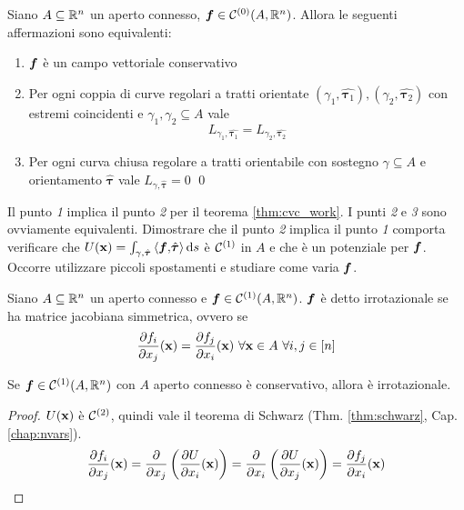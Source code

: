 \begin{theorem}
	Siano $A\subseteq\mathbb{R}^n$ un aperto connesso, $\bm f \in \mathcal{C}^{(0)}(A,\mathbb{R}^n)$. Allora le seguenti affermazioni sono equivalenti:
	\begin{enumerate}
		\item $\bm f$ è un campo vettoriale conservativo
		\item Per ogni coppia di curve regolari a tratti orientate $(\gamma_1,\hat{\bm\tau_1}), (\gamma_2,\hat{\bm\tau_2})$ con estremi coincidenti e $\gamma_1,\gamma_2 \subseteq A$ vale
		$$
			L_{\gamma_1,\hat{\bm\tau_1}}=L_{\gamma_2,\hat{\bm\tau_2}}
		$$
		\item Per ogni curva chiusa regolare a tratti orientabile con sostegno $\gamma \subseteq A$ e orientamento $\hat{\bm\tau}$ vale $L_{\gamma, \hat{\bm\tau}}=0$
		\qed
	\end{enumerate}
\end{theorem}

\begin{remark}
	Il punto \textit{1} implica il punto \textit{2} per il teorema \ref{thm:cvc_work}. I punti \textit{2} e \textit{3} sono ovviamente equivalenti. Dimostrare che il punto \textit{2} implica il punto \textit{1} comporta verificare che $U(\vb{x})=\int_{\gamma,\hat{\bm\tau}}\left\langle\bm f{,}\hat{\bm\tau}\right\rangle\dd s$ è $\mathcal{C}^{(1)}$ in $A$ e che è un potenziale per $\bm f$. Occorre utilizzare piccoli spostamenti e studiare come varia $\bm f$.
\end{remark}

\begin{definition}
	Siano $A\subseteq\mathbb{R}^n$ un aperto connesso e $\bm f \in \mathcal{C}^{(1)}(A,\mathbb{R}^n)$. $\bm f$ è detto irrotazionale se ha matrice jacobiana simmetrica, ovvero se
	$$
		\frac{\partial f_i}{\partial x_j}(\vb{x})=\frac{\partial f_j}{\partial x_i}(\vb{x}) \ \forall \vb{x} \in A \ \forall i,j \in [n]
	$$
\end{definition}

\begin{theorem}
	Se $\bm f \in \mathcal{C}^{(1)}(A,\mathbb{R}^n)$ con $A$ aperto connesso è conservativo, allora è irrotazionale.
\end{theorem}

\begin{proof}
	$U(\vb{x})$ è $\mathcal{C}^{(2)}$, quindi vale il teorema di Schwarz (Thm. \ref{thm:schwarz}, Cap. \ref{chap:nvars}).
	$$
		\frac{\partial f_i}{\partial x_j}(\vb{x})
		=\frac{\partial}{\partial x_j}\left(\frac{\partial U}{\partial x_i}(\vb{x})\right)=\frac{\partial}{\partial x_i}\left(\frac{\partial U}{\partial x_j}(\vb{x})\right)
		=\frac{\partial f_j}{\partial x_i}(\vb{x})
	$$
\end{proof}

